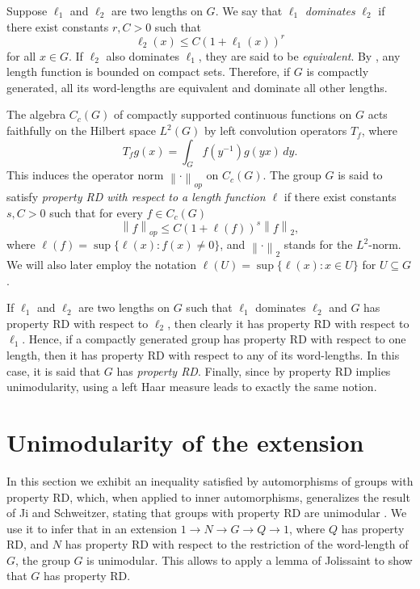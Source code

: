 \documentclass{amsart}
\theoremstyle{definition}
\theoremstyle{remark}
\begin{document}
Suppose $\ell_1$ and $\ell_2$ are two lengths on $G$. We say that $\ell_1$
\emph{dominates} $\ell_2$ if there exist constants $r,C>0$ such that
\begin{equation}
  \label{eq:def-dominates}
  \ell_2(x) \leq C(1+\ell_1(x))^r
\end{equation}
for all $x\in G$. If $\ell_2$ also dominates $\ell_1$, they are said
to be \emph{equivalent}. By \cite[Theorem 1.2.11]{Schweitzer1993}, any
length function is bounded on compact sets. Therefore, if $G$ is
compactly generated, all its word-lengths are equivalent and dominate
all other lengths.

The algebra $C_c(G)$ of compactly supported continuous functions on
$G$ acts faithfully on the Hilbert space $L^2(G)$ by left convolution
operators $T_f$, where
\begin{equation}
  \label{eq:1}
  T_fg(x) = \int_G f(y^{-1})g(yx)\,dy.
\end{equation}
This induces the operator norm $
$${\left\lVert{\cdot}\right\rVert}_{op}$ on $C_c(G)$. The group $G$ is said to satisfy
\emph{property RD with respect to a length function $\ell$} if there
exist constants $s,C>0$ such that for every $f\in C_c(G)$
 \begin{equation}
  \label{eq:def-RD}
  {\left\lVert{f}\right\rVert}_{op}\leq C(1+\ell(f))^s {\left\lVert{f}\right\rVert}_2,  
\end{equation}
where $\ell(f)=\sup\{\ell(x) : f(x)\ne 0\}$, and ${\left\lVert{\cdot}\right\rVert}_2$
stands for the  $L^2$-norm. We will also later employ the notation
$\ell(U) = \sup\{\ell(x) : x\in U\}$ for $U\subseteq G$. 

If $\ell_1$ and $\ell_2$ are two lengths on $G$ such that $\ell_1$
dominates $\ell_2$ and $G$ has property RD with respect to $\ell_2$,
then clearly it has property RD with respect to $\ell_1$.  Hence, if a
compactly generated group has property RD with respect to one length,
then it has property RD with respect to any of its word-lengths. In
this case, it is said that $G$ has \emph{property RD}.
Finally, since by \cite{Ronghui1996} property RD implies
unimodularity, using a left Haar measure leads to exactly the same notion.

\section{Unimodularity of the extension}
\label{sec:unimodularity}

In this section we exhibit an inequality satisfied by automorphisms of
groups with property RD, which, when applied to inner automorphisms,
generalizes the result of Ji and Schweitzer, stating that groups with
property RD are unimodular \cite{Ronghui1996}. We use it to infer
that in an extension $1\to N\to G\to Q\to 1$, where $Q$ has property
RD, and $N$ has property RD with respect to the restriction of the
word-length of $G$, the group $G$ is unimodular. This allows to
apply a lemma of Jolissaint to show that $G$ has property RD.
\end{document}
